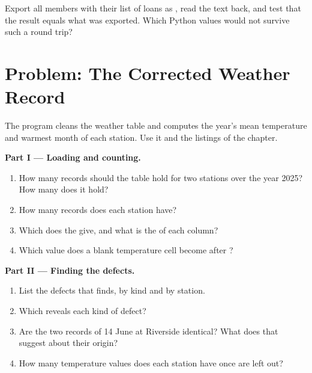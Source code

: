 \begin{exercise}[$\star\star\star$]\label{exo:g10:data-tables:15}
Export all members with their list of loans as , read the text back, and test that the result equals what was
exported. Which Python values would not survive such a round trip?
\end{exercise}

\section{Problem: The Corrected Weather Record}\label{sec:g10:data-tables:problem}

\begin{problem}\label{pb:g10:data-tables:1}
The program  cleans the weather table and computes the year's mean temperature
and warmest month of each station. Use it and the listings of the chapter.

\medskip\noindent\textbf{Part I --- Loading and counting.}
\begin{enumerate}
  \item How many records should the table hold for two stations over the year 2025? How many does it hold?
  \item How many records does each station have?
  \item Which  does the  give, and what is the  of each column?
  \item Which value does a blank temperature cell become after ?
\end{enumerate}

\medskip\noindent\textbf{Part II --- Finding the defects.}
\begin{enumerate}[resume]
  \item List the defects that  finds, by kind and by station.
  \item Which  reveals each kind of defect?
  \item Are the two records of 14 June at Riverside identical? What does that suggest about their origin?
  \item How many temperature values does each station have once  are left out?
\end{enumerate}


\end{problem}
